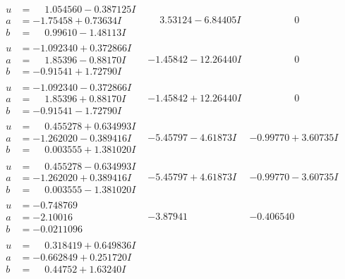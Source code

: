 \documentclass[1p]{elsarticle_modified}
\theoremstyle{definition}
\begin{document}
$$\begin{array}{c|c|c}
\begin{aligned}
u &= \phantom{-}1.054560 - 0.387125 I \\
a &= -1.75458 + 0.73634 I \\
b &= \phantom{-}0.99610 - 1.48113 I\end{aligned}
 & \phantom{-}3.53124 - 6.84405 I & \phantom{-0.000000 } 0 \\ \hline\begin{aligned}
u &= -1.092340 + 0.372866 I \\
a &= \phantom{-}1.85396 - 0.88170 I \\
b &= -0.91541 + 1.72790 I\end{aligned}
 & -1.45842 - 12.26440 I & \phantom{-0.000000 } 0 \\ \hline\begin{aligned}
u &= -1.092340 - 0.372866 I \\
a &= \phantom{-}1.85396 + 0.88170 I \\
b &= -0.91541 - 1.72790 I\end{aligned}
 & -1.45842 + 12.26440 I & \phantom{-0.000000 } 0 \\ \hline\begin{aligned}
u &= \phantom{-}0.455278 + 0.634993 I \\
a &= -1.262020 - 0.389416 I \\
b &= \phantom{-}0.003555 + 1.381020 I\end{aligned}
 & -5.45797 - 4.61873 I & -0.99770 + 3.60735 I \\ \hline\begin{aligned}
u &= \phantom{-}0.455278 - 0.634993 I \\
a &= -1.262020 + 0.389416 I \\
b &= \phantom{-}0.003555 - 1.381020 I\end{aligned}
 & -5.45797 + 4.61873 I & -0.99770 - 3.60735 I \\ \hline\begin{aligned}
u &= -0.748769\phantom{ +0.000000I} \\
a &= -2.10016\phantom{ +0.000000I} \\
b &= -0.0211096\phantom{ +0.000000I}\end{aligned}
 & -3.87941\phantom{ +0.000000I} & -0.406540\phantom{ +0.000000I} \\ \hline\begin{aligned}
u &= \phantom{-}0.318419 + 0.649836 I \\
a &= -0.662849 + 0.251720 I \\
b &= \phantom{-}0.44752 + 1.63240 I\end{aligned}

\end{array}$$
\end{document}
